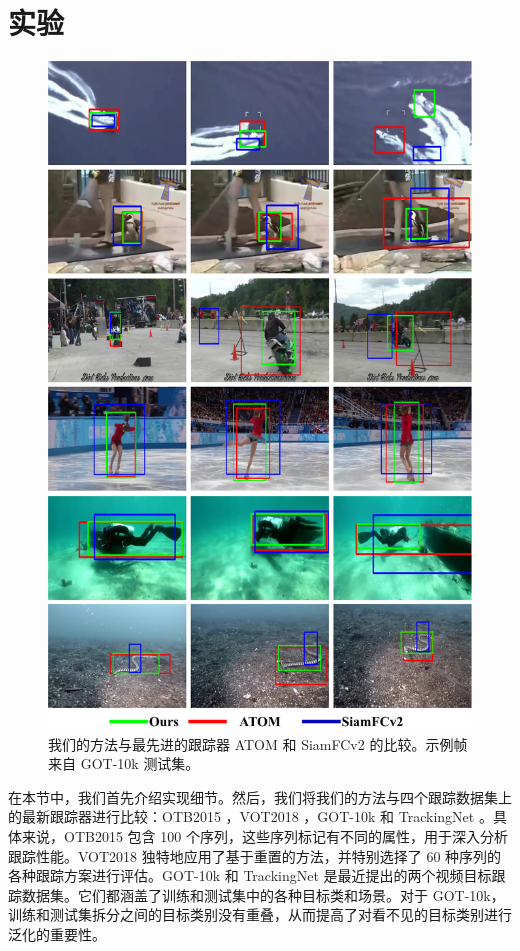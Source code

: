 \section{实验}

\begin{figure}[t]
    \centering
    \includegraphics[width=1.0\textwidth]{Img/MTP/got10k/visulization.pdf}
    \caption{我们的方法与最先进的跟踪器 ATOM \cite{danelljan2019atom} 和 SiamFCv2 \cite{SiamFC} 的比较。示例帧来自 GOT-10k \cite{GOT-10k} 测试集。}
    \label{fig:vis}
\end{figure}

在本节中，我们首先介绍实现细节。然后，我们将我们的方法与四个跟踪数据集上的最新跟踪器进行比较：OTB2015 \cite{OTB}，VOT2018 \cite{kristan2018sixth}，GOT-10k \cite{GOT-10k} 和 TrackingNet \cite{muller2018trackingnet}。具体来说，OTB2015 \cite{OTB} 包含 100 个序列，这些序列标记有不同的属性，用于深入分析跟踪性能。VOT2018 \cite{kristan2018sixth} 独特地应用了基于重置的方法，并特别选择了 60 种序列的各种跟踪方案进行评估。GOT-10k \cite{GOT-10k} 和 TrackingNet \cite{muller2018trackingnet} 是最近提出的两个视频目标跟踪数据集。它们都涵盖了训练和测试集中的各种目标类和场景。对于 GOT-10k，训练和测试集拆分之间的目标类别没有重叠，从而提高了对看不见的目标类别进行泛化的重要性。

